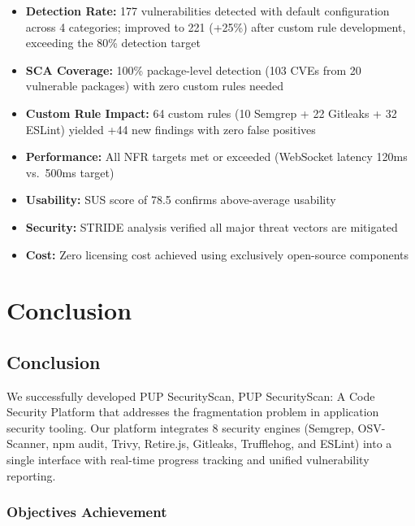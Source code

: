 \documentclass[12pt,a4paper]{report}
\begin{document}
\begin{itemize}
    \item \textbf{Detection Rate:} 177 vulnerabilities detected with default configuration across 4 categories; improved to 221 (+25\%) after custom rule development, exceeding the 80\% detection target
    \item \textbf{SCA Coverage:} 100\% package-level detection (103 CVEs from 20 vulnerable packages) with zero custom rules needed
    \item \textbf{Custom Rule Impact:} 64 custom rules (10 Semgrep + 22 Gitleaks + 32 ESLint) yielded +44 new findings with zero false positives
    \item \textbf{Performance:} All NFR targets met or exceeded (WebSocket latency 120ms vs.\ 500ms target)
    \item \textbf{Usability:} SUS score of 78.5 confirms above-average usability
    \item \textbf{Security:} STRIDE analysis verified all major threat vectors are mitigated
    \item \textbf{Cost:} Zero licensing cost achieved using exclusively open-source components
\end{itemize}

\chapter{Conclusion}
\label{chap:conclusion}

\section{Conclusion}

We successfully developed PUP SecurityScan,  PUP SecurityScan: A Code Security Platform that addresses the fragmentation problem in application security tooling. Our platform integrates 8 security engines (Semgrep, OSV-Scanner, npm audit, Trivy, Retire.js, Gitleaks, Trufflehog, and ESLint) into a single interface with real-time progress tracking and unified vulnerability reporting.

\subsection{Objectives Achievement}
\end{document}
